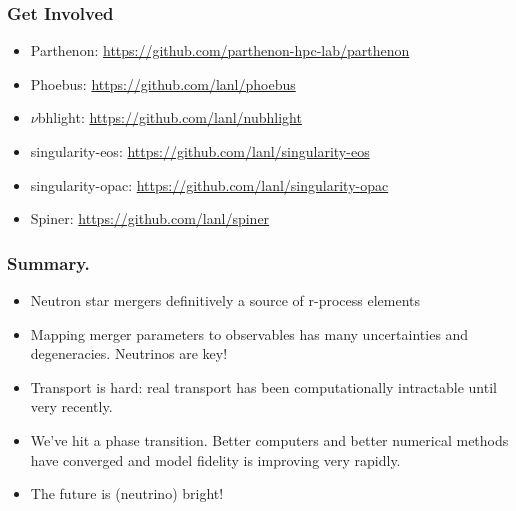 \documentclass[]{beamer}
\newcommand{\backupbegin}{
   \newcounter{finalframe}
   \setcounter{finalframe}{\value{framenumber}}
}
\begin{document}
\begin{frame}
  \frametitle{Get Involved}
  \begin{itemize}
  \item Parthenon: \url{https://github.com/parthenon-hpc-lab/parthenon}
  \item Phoebus: \url{https://github.com/lanl/phoebus}
  \item $\nu$bhlight: \url{https://github.com/lanl/nubhlight}
  \item singularity-eos: \url{https://github.com/lanl/singularity-eos}
  \item singularity-opac: \url{https://github.com/lanl/singularity-opac}
  \item Spiner: \url{https://github.com/lanl/spiner}
  \end{itemize}
\end{frame}

\begin{frame}
  \frametitle{Summary.}
  \begin{itemize}
  \item Neutron star mergers definitively a source of r-process elements
  \item Mapping merger parameters to observables has many
    uncertainties and degeneracies. Neutrinos are key!
  \item Transport is hard: real transport has been computationally
    intractable until very recently.
  \item We've hit a phase transition. Better computers and better
    numerical methods have converged and model fidelity is improving
    very rapidly.
  \item The future is (neutrino) bright!
  \end{itemize}
\end{frame}

\backupbegin
\end{document}
